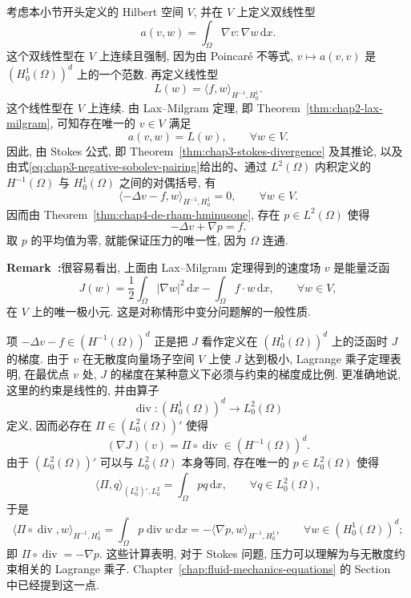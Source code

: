 \begin{Proof}
考虑本小节开头定义的 Hilbert 空间 $V$, 并在 $V$ 上定义双线性型
\[
 a(v,w)=\int_\Omega\nabla v:\nabla w\,\mathrm dx.
\]
这个双线性型在 $V$ 上连续且强制, 因为由 Poincaré 不等式, $v\mapsto a(v,v)$ 是 $(H_0^1(\Omega))^d$ 上的一个范数. 再定义线性型
\[
 L(w)=\langle f,w\rangle_{H^{-1},H_0^1}.
\]
这个线性型在 $V$ 上连续. 由 Lax--Milgram 定理, 即 Theorem~\ref{thm:chap2-lax-milgram}, 可知存在唯一的 $v\in V$ 满足
\begin{equation}
 a(v,w)=L(w),\qquad\forall w\in V.
 \label{eq:chap4-stokes-variational-problem}
\end{equation}
因此, 由 Stokes 公式, 即 Theorem~\ref{thm:chap3-stokes-divergence} 及其推论, 以及由式\eqref{eq:chap3-negative-sobolev-pairing}给出的、通过 $L^2(\Omega)$ 内积定义的 $H^{-1}(\Omega)$ 与 $H_0^1(\Omega)$ 之间的对偶括号, 有
\[
 \langle-\Delta v-f,w\rangle_{H^{-1},H_0^1}=0,
 \qquad\forall w\in V.
\]
因而由 Theorem~\ref{thm:chap4-de-rham-hminusone}, 存在 $p\in L^2(\Omega)$ 使得
\[
 -\Delta v+\nabla p=f.
\]
取 $p$ 的平均值为零, 就能保证压力的唯一性, 因为 $\Omega$ 连通.
\end{Proof}

\par\noindent{}\textbf{Remark~\thechapterfoursectionfiveremark:}\label{rem:chap4-stokes-energy-minimizer}\quad 很容易看出, 上面由 Lax--Milgram 定理得到的速度场 $v$ 是能量泛函
\[
 J(w)=\frac12\int_\Omega|\nabla w|^2\,\mathrm dx-\int_\Omega f\cdot w\,\mathrm dx,
 \qquad\forall w\in V,
\]
在 $V$ 上的唯一极小元. 这是对称情形中变分问题解的一般性质.

项 $-\Delta v-f\in(H^{-1}(\Omega))^d$ 正是把 $J$ 看作定义在 $(H_0^1(\Omega))^d$ 上的泛函时 $J$ 的梯度. 由于 $v$ 在无散度向量场子空间 $V$ 上使 $J$ 达到极小, Lagrange 乘子定理表明, 在最优点 $v$ 处, $J$ 的梯度在某种意义下必须与约束的梯度成比例. 更准确地说, 这里的约束是线性的, 并由算子
\[
 \operatorname{div}:(H_0^1(\Omega))^d\longrightarrow L_0^2(\Omega)
\]
定义, 因而必存在 $\Pi\in(L_0^2(\Omega))'$ 使得
\[
 (\nabla J)(v)=\Pi\circ\operatorname{div}\in(H^{-1}(\Omega))^d.
\]
由于 $(L_0^2(\Omega))'$ 可以与 $L_0^2(\Omega)$ 本身等同, 存在唯一的 $p\in L_0^2(\Omega)$ 使得
\[
 \langle\Pi,q\rangle_{(L_0^2)',L_0^2}=\int_\Omega pq\,\mathrm dx,
 \qquad\forall q\in L_0^2(\Omega),
\]
于是
\[
 \langle\Pi\circ\operatorname{div},w\rangle_{H^{-1},H_0^1}
 =\int_\Omega p\operatorname{div}w\,\mathrm dx
 =-\langle\nabla p,w\rangle_{H^{-1},H_0^1},
 \qquad\forall w\in(H_0^1(\Omega))^d;
\]
即 $\Pi\circ\operatorname{div}=-\nabla p$. 这些计算表明, 对于 Stokes 问题, 压力可以理解为与无散度约束相关的 Lagrange 乘子. Chapter~\ref{chap:fluid-mechanics-equations} 的 Section~ 中已经提到这一点.


